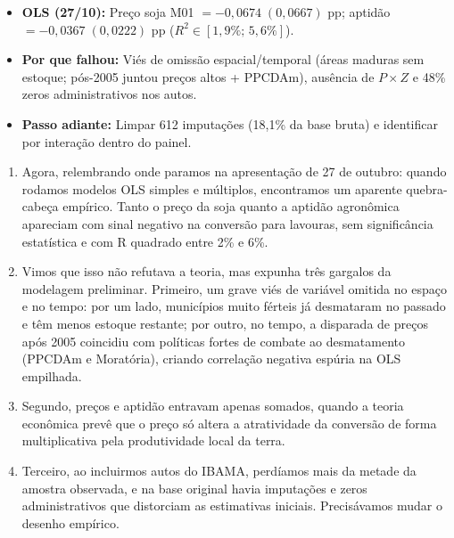 \documentclass[11pt,a4paper]{article}
\begin{document}
\begin{tcolorbox}[title={\bfseries\small ÂNCORAS EMPÍRICAS E CONCEITUAIS DO SLIDE}]
\begin{itemize}[leftmargin=*,itemsep=1mm,topsep=0.5mm]
    \item \textbf{OLS (27/10):} Preço soja M01 $= -0{,}0674\;(0{,}0667)$ pp; aptidão $= -0{,}0367\;(0{,}0222)$ pp ($R^2 \in [1{,}9\%;\, 5{,}6\%]$).
    \item \textbf{Por que falhou:} Viés de omissão espacial/temporal (áreas maduras sem estoque; pós-2005 juntou preços altos + PPCDAm), ausência de $P \times Z$ e 48\% zeros administrativos nos autos.
    \item \textbf{Passo adiante:} Limpar 612 imputações (18,1\% da base bruta) e identificar por interação dentro do painel.
\end{itemize}
\end{tcolorbox}
\vspace{2mm}

\vspace{0.8mm}
\begin{enumerate}[leftmargin=*,label=\textbf{(\arabic*)},itemsep=2.8mm,topsep=1mm]
    \item Agora, relembrando onde paramos na apresentação de 27 de outubro: quando rodamos modelos OLS simples e múltiplos, encontramos um aparente quebra-cabeça empírico. Tanto o preço da soja quanto a aptidão agronômica apareciam com sinal negativo na conversão para lavouras, sem significância estatística e com R quadrado entre 2\% e 6\%.
    \item Vimos que isso não refutava a teoria, mas expunha três gargalos da modelagem preliminar. Primeiro, um grave viés de variável omitida no espaço e no tempo: por um lado, municípios muito férteis já desmataram no passado e têm menos estoque restante; por outro, no tempo, a disparada de preços após 2005 coincidiu com políticas fortes de combate ao desmatamento (PPCDAm e Moratória), criando correlação negativa espúria na OLS empilhada.
    \item Segundo, preços e aptidão entravam apenas somados, quando a teoria econômica prevê que o preço só altera a atratividade da conversão de forma multiplicativa pela produtividade local da terra.
    \item Terceiro, ao incluirmos autos do IBAMA, perdíamos mais da metade da amostra observada, e na base original havia imputações e zeros administrativos que distorciam as estimativas iniciais. Precisávamos mudar o desenho empírico.
\end{enumerate}
\end{document}
